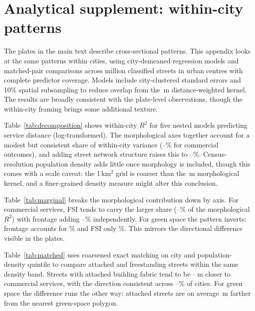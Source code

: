 \documentclass[review,authoryear]{elsarticle}
\begin{document}
\section{Analytical supplement: within-city patterns}
\label{sec:analytical-supplement}

The plates in the main text describe cross-sectional patterns. This appendix looks at the same patterns within cities, using city-demeaned regression models and matched-pair comparisons across \nAnalysisMStreets{} million classified streets in \nAnalysisCities{} urban centres with complete predictor coverage. Models include city-clustered standard errors and 10\% spatial subsampling to reduce overlap from the \,m distance-weighted kernel. The results are broadly consistent with the plate-level observations, though the within-city framing brings some additional texture.

Table~\ref{tab:decomposition} shows within-city $R^2$ for five nested models predicting service distance (log-transformed). The morphological axes together account for a modest but consistent share of within-city variance (\rSqMorphMin--\rSqMorphMax\% for commercial outcomes), and adding street network structure raises this to \rSqMorphNetMin--\rSqMorphNetMax\%. Census-resolution population density adds little once morphology is included, though this comes with a scale caveat: the 1\,km$^2$ grid is coarser than the \,m morphological kernel, and a finer-grained density measure might alter this conclusion.



Table~\ref{tab:marginal} breaks the morphological contribution down by axis. For commercial services, FSI tends to carry the larger share (\mFSIshareMin--\mFSIshareMax\% of the morphological $R^2$) with frontage adding \mContshareMin--\mContshareMax\% independently. For green space the pattern inverts: frontage accounts for \mContGreenShare\% and FSI only \mFSIGreenShare\%. This mirrors the directional difference visible in the plates.



Table~\ref{tab:matched} uses coarsened exact matching on city and population-density quintile to compare attached and freestanding streets within the same density band. Streets with attached building fabric tend to be \matchedGainMin--\matchedGainMax\,m closer to commercial services, with the direction consistent across \matchedDirMin--\matchedDirMax\% of cities. For green space the difference runs the other way: attached streets are on average \matchedGreenLoss\,m farther from the nearest green-space polygon.
\end{document}
